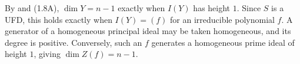 By  and (1.8A), $\dim Y=n-1$ exactly when $I(Y)$ has height $1$. Since $S$ is a UFD, this holds exactly when $I(Y)=(f)$ for an irreducible polynomial $f$. A generator of a homogeneous principal ideal may be taken homogeneous, and its degree is positive. Conversely, such an $f$ generates a homogeneous prime ideal of height $1$, giving $\dim Z(f)=n-1$.
